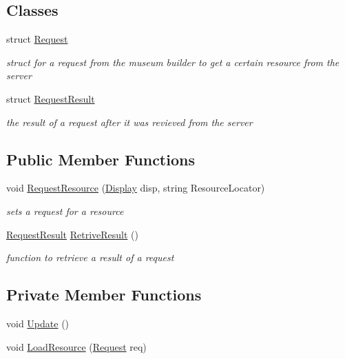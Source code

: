 \subsection*{Classes}
\begin{DoxyCompactItemize}
\item 
struct \mbox{\hyperlink{struct_resource_loader_1_1_request}{Request}}
\begin{DoxyCompactList}\small\item\em struct for a request from the museum builder to get a certain resource from the server \end{DoxyCompactList}\item 
struct \mbox{\hyperlink{struct_resource_loader_1_1_request_result}{Request\+Result}}
\begin{DoxyCompactList}\small\item\em the result of a request after it was revieved from the server \end{DoxyCompactList}\end{DoxyCompactItemize}
\subsection*{Public Member Functions}
\begin{DoxyCompactItemize}
\item 
void \mbox{\hyperlink{class_resource_loader_af8914b966c0734e7f5fb3a81a9a968fa}{Request\+Resource}} (\mbox{\hyperlink{class_display}{Display}} disp, string Resource\+Locator)
\begin{DoxyCompactList}\small\item\em sets a request for a resource \end{DoxyCompactList}\item 
\mbox{\hyperlink{struct_resource_loader_1_1_request_result}{Request\+Result}} \mbox{\hyperlink{class_resource_loader_ae0f219fead6e05415dc2523529d81561}{Retrive\+Result}} ()
\begin{DoxyCompactList}\small\item\em function to retrieve a result of a request \end{DoxyCompactList}\end{DoxyCompactItemize}
\subsection*{Private Member Functions}
\begin{DoxyCompactItemize}
\item 
void \mbox{\hyperlink{class_resource_loader_a20a1036648a453863c96b51d33edfa11}{Update}} ()
\item 
void \mbox{\hyperlink{class_resource_loader_a088ef33ee82be6e64028b6b5512fad5d}{Load\+Resource}} (\mbox{\hyperlink{struct_resource_loader_1_1_request}{Request}} req)
\end{DoxyCompactItemize}

